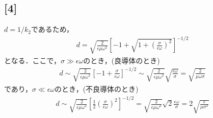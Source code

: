 \documentclass[12pt,dvipdfmx]{jsarticle}
\begin{document}
\subsection*{\large{[4]}}
$d=1/k_2$であるため，
\begin{eqnarray}
  d = \sqrt{\frac{2}{\epsilon\mu\omega^2}}\left[ -1+\sqrt{1+\left(\frac{\sigma}{\epsilon\omega}\right)^2} \right]^{-1/2}
\end{eqnarray}
となる．ここで，$\sigma\gg \epsilon\omega$のとき，(良導体のとき)
\begin{eqnarray}
  d \sim \sqrt{\frac{2}{\epsilon\mu\omega^2}} \left[ -1+\frac{\sigma}{\epsilon\omega} \right]^{-1/2}\sim \sqrt{\frac{2}{\epsilon\mu\omega^2}}\sqrt{\frac{\epsilon\omega}{\sigma}} = \sqrt{\frac{2}{\mu\omega\sigma}}
\end{eqnarray}
であり，$\sigma\ll \epsilon\omega$のとき，(不良導体のとき)
\begin{eqnarray}
  d \sim \sqrt{\frac{2}{\epsilon\mu\omega^2}} \left[\frac{1}{2}\left(\frac{\sigma}{\epsilon\omega}\right)^2 \right]^{-1/2} = \sqrt{\frac{2}{\epsilon\mu\omega^2}}\sqrt{2}\frac{\epsilon\omega}{\sigma}=2\sqrt{\frac{\epsilon}{\mu\sigma^2}}
\end{eqnarray}
\end{document}
